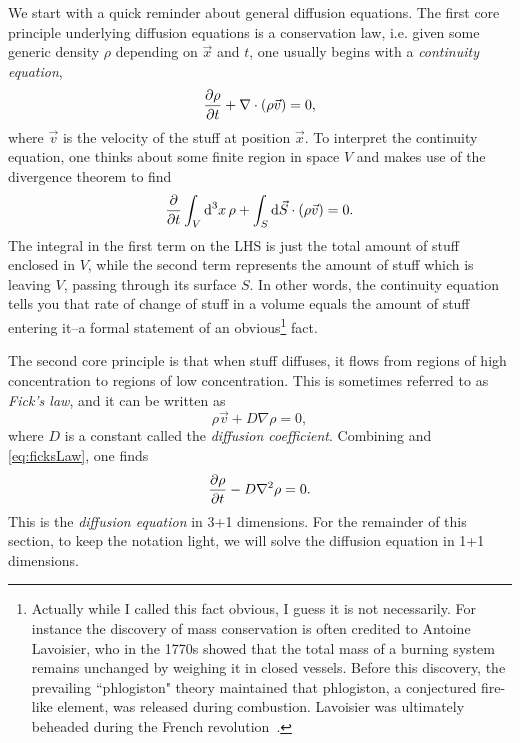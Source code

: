 We start with a quick reminder about general diffusion equations.
The first core
principle underlying diffusion equations is a conservation law, i.e.
given some generic density $\rho$ depending on $\vec{x}$ and $t$,
one usually begins with a {\it continuity equation},
\begin{equation}\label{eq:continuityEquation}
  \pdv{\rho}{t}+\nabla\cdot\left(\rho\vec{v}\right)=0,
\end{equation}
where $\vec{v}$ is the velocity of the stuff at position $\vec{x}$. 
To interpret the continuity equation, one thinks about some finite region
in space $V$ and makes use of the divergence theorem to find
\begin{equation}
  \pdv{t}\int_V \dd[3]{x}\rho
     +\int_{S}\dd{\vec{S}}\cdot\left(\rho\vec{v}\right)=0.
\end{equation}
The integral in the first term on the LHS is just the total amount of
stuff enclosed in $V$, while the second term represents the amount of
stuff which is leaving $V$, passing through its surface $S$. In other
words, the continuity equation tells you that rate of change of stuff
in a volume equals the amount of stuff entering it--a formal statement
of an obvious\footnote{Actually while I called this fact obvious,
I guess it is not necessarily. For instance the discovery of mass conservation
is often credited to Antoine Lavoisier, who in the 1770s showed that 
the total mass of a burning system remains unchanged by weighing it
in closed vessels. Before this discovery, the prevailing ``phlogiston"
theory maintained that phlogiston, a conjectured fire-like element,
was released during combustion. Lavoisier was ultimately beheaded
during the French revolution~\cite{wiki:phlogiston,wiki:laviosier}.} fact. 

The second core principle is that when stuff diffuses, it flows from regions
of high concentration to regions of low concentration. This is
sometimes referred to as {\it Fick's law}, and it
can be written as
\begin{equation}\label{eq:ficksLaw}
  \rho\vec{v}+D\nabla\rho=0,
\end{equation}
where $D$ is a constant called the {\it diffusion coefficient}. Combining
 and \eqref{eq:ficksLaw}, one finds
\begin{equation}
  \pdv{\rho}{t}-D\nabla^2\rho = 0.
\end{equation}
This is the {\it diffusion equation} in 3+1 dimensions. For the remainder
of this section, to keep the notation light, we will solve the diffusion
equation in 1+1 dimensions.

